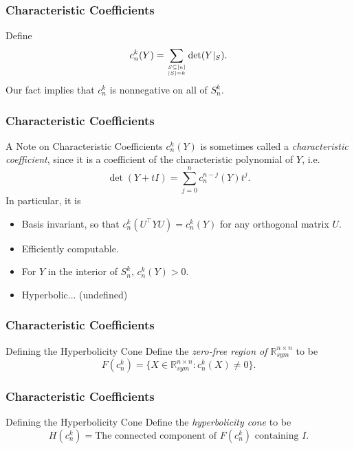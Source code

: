 \documentclass{beamer}
\newcommand{\R}{\mathbb{R}}
\newcommand{\Sym}{\R^{n\times n}_{sym}}
\renewcommand\top[2]{\genfrac{}{}{0pt}{}{#1}{#2}}
\begin{document}
\begin{frame}
    \frametitle{Characteristic Coefficients}
    Define
    \[
        c_n^k(Y) = \sum_{\top{S \subseteq [n]}{|S| = k}}  \det(Y|_S).
    \]
    \pause 
    Our fact implies that $c_n^k$ is nonnegative on all of $S^k_n$.
\end{frame}
\begin{frame}
    \frametitle{Characteristic Coefficients}
    \begin{block}{A Note on Characteristic Coefficients}
        $c_n^k(Y)$ is sometimes called a \emph{characteristic coefficient}, since it is a coefficient of the characteristic polynomial of $Y$, i.e.
        \[
            \det(Y + tI) = \sum_{j=0}^n c_n^{n-j}(Y) t^j.
        \]
        \pause
        In particular, it is
        \begin{itemize}
            \item Basis invariant, so that $c_n^k(U^{\intercal} Y U) = c_n^k(Y)$ for any orthogonal matrix $U$.
            \pause
            \item Efficiently computable.
            \pause
            \item For $Y$ in the interior of $S^k_n$, $c_n^k(Y) > 0$.
            \pause
            \item Hyperbolic... (undefined)
        \end{itemize}
    \end{block}
\end{frame}
\begin{frame}
    \frametitle{Characteristic Coefficients}
    \begin{block}{Defining the Hyperbolicity Cone}
        Define the \emph{zero-free region of $\Sym$} to be 
        \[
            F(c^k_n) = \{ X \in \Sym : c_n^k(X) \neq 0\}.
        \]
    \end{block}
\end{frame}
\begin{frame}
    \frametitle{Characteristic Coefficients}
    \begin{block}{Defining the Hyperbolicity Cone}
        Define the \emph{hyperbolicity cone} to be 
        \[
            H(c^k_n) = \text{The connected component of }F(c^k_n) \text{ containing }I.
        \]
    \end{block}
\end{frame}
\end{document}
